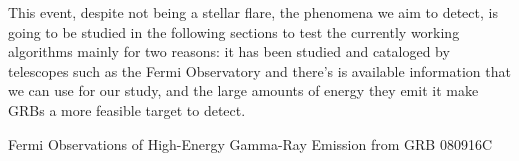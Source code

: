 This event, despite not being a stellar flare, the phenomena we aim to detect, is going to be studied in the following sections to test the currently working algorithms mainly for two reasons: it has been studied and cataloged by telescopes such as the Fermi Observatory and there’s is available information that we can use for our study, and the large amounts of energy they emit it make GRBs a more feasible target to detect.

{Fermi Observations of High-Energy Gamma-Ray Emission from GRB 080916C}




